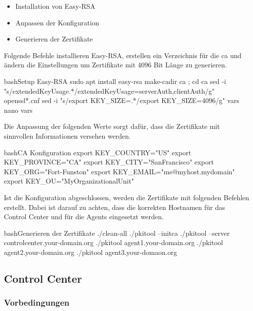 \begin{itemize}
\item Installation von Easy-RSA
\item Anpassen der Konfiguration
\item Generieren der Zertifikate
\end{itemize}

Folgende Befehle installieren Easy-RSA, erstellen ein Verzeichnis für die \gls{ca} und ändern die Einstellungen um Zertifikate mit 4096 Bit Länge zu generieren.

\begin{srclst}[label=lst:ca:installation1]{bash}{Setup Easy-RSA}
sudo apt install easy-rsa
make-cadir ca ; cd ca
sed -i "s/extendedKeyUsage.*/extendedKeyUsage=serverAuth,clientAuth/g" openssl*.cnf
sed -i "s/export KEY_SIZE=.*/export KEY_SIZE=4096/g" vars
nano vars
\end{srclst}

Die Anpassung der folgenden Werte sorgt dafür, dass die Zertifikate mit sinnvollen Informationen versehen werden.

\begin{srclst}[label=lst:ca:installation2]{bash}{CA Konfiguration}
export KEY_COUNTRY="US"
export KEY_PROVINCE="CA"
export KEY_CITY="SanFrancisco"
export KEY_ORG="Fort-Funston"
export KEY_EMAIL="me@myhost.mydomain"
export KEY_OU="MyOrganizationalUnit"
\end{srclst}

Ist die Konfiguration abgeschlossen, werden die Zertifikate mit folgenden Befehlen erstellt. Dabei ist darauf zu achten, dass die korrekten Hostnamen für das Control Center und für die Agents eingesetzt werden.

\begin{srclst}[label=lst:ca:installation3]{bash}{Generieren der Zertifikate}
./clean-all
./pkitool --initca
./pkitool --server controlcenter.your-domain.org
./pkitool agent1.your-domain.org
./pkitool agent2.your-domain.org
./pkitool agent3.your-domaon.org
\end{srclst}

\subsection*{Control Center}

\subsubsection*{Vorbedingungen}

